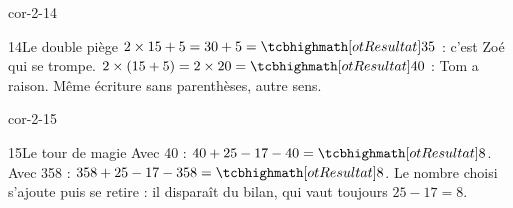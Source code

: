 \begin{blocLivre}{cor-2-14}\begin{corrige}{14}{Le double piège}
$2\times15+5=30+5=\res{35}$ : c’est Zoé qui se trompe. $2\times(15+5)=2\times20=\res{40}$ : Tom a raison. Même écriture sans parenthèses, autre sens.
\end{corrige}\end{blocLivre}
\begin{blocLivre}{cor-2-15}\begin{corrige}{15}{Le tour de magie}
Avec 40 : $40+25-17-40=\res8$. Avec 358 : $358+25-17-358=\res8$. Le nombre choisi s’ajoute puis se retire : il disparaît du bilan, qui vaut toujours $25-17=8$.
\end{corrige}\end{blocLivre}
